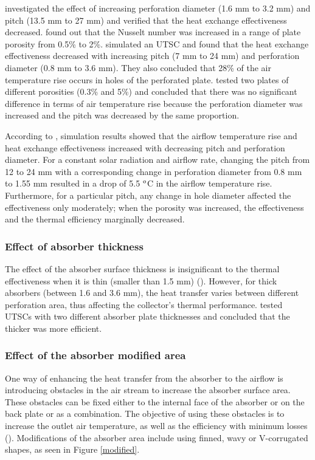 \citet{Kutscher1994} investigated the effect of increasing perforation diameter (1.6 mm to 3.2 mm) and pitch (13.5 mm to 27 mm) and verified that the heat exchange effectiveness decreased. \citet{Arulanandam1999} found out that the Nusselt number was increased in a range of plate porosity from 0.5\% to 2\%. \citet{Decker2001} simulated an UTSC and found that the heat exchange effectiveness decreased with increasing pitch (7 mm to 24 mm) and perforation diameter (0.8 mm to 3.6 mm). They also concluded that 28\% of the air temperature rise occurs in holes of the perforated plate. \citet{Gawlik2005} tested two plates of different porosities (0.3\% and 5\%) and concluded that there was no significant difference in terms of air temperature rise because the perforation diameter was increased and the pitch was decreased by the same proportion. 

According to \citet{Leon2007}, simulation results showed that the airflow temperature rise and heat exchange effectiveness increased with decreasing pitch and perforation diameter. For a constant solar radiation and airflow rate, changing the pitch from 12 to 24 mm with a corresponding change in perforation diameter from 0.8 mm to 1.55 mm resulted in a drop of 5.5 $^{\rm o}$C in the airflow temperature rise. Furthermore, for a particular pitch, any change in hole diameter affected the effectiveness only moderately; when the porosity was increased, the effectiveness and the thermal efficiency marginally decreased.

\subsubsection{Effect of absorber thickness}   

The effect of the absorber surface thickness is insignificant to the thermal effectiveness when it is thin (smaller than 1.5 mm) (\cite{Kutscher1994}). However, for thick absorbers (between 1.6 and 3.6 mm), the heat transfer varies between different perforation area, thus affecting the collector's thermal performance. \citet{Zomorodian2012} tested UTSCs with two different absorber plate thicknesses and concluded that the thicker was more efficient.

\subsubsection{Effect of the absorber modified area}

One way of enhancing the heat transfer from the absorber to the airflow is introducing obstacles in the air stream to increase the absorber surface area. These obstacles can be fixed either to the internal face of the absorber or on the back plate or as a combination. The objective of using these obstacles is to increase the outlet air temperature, as well as the efficiency with minimum losses (\cite{Karsli2007}). Modifications of the absorber area include using finned, wavy or V-corrugated shapes, as seen in Figure \ref{modified}.

